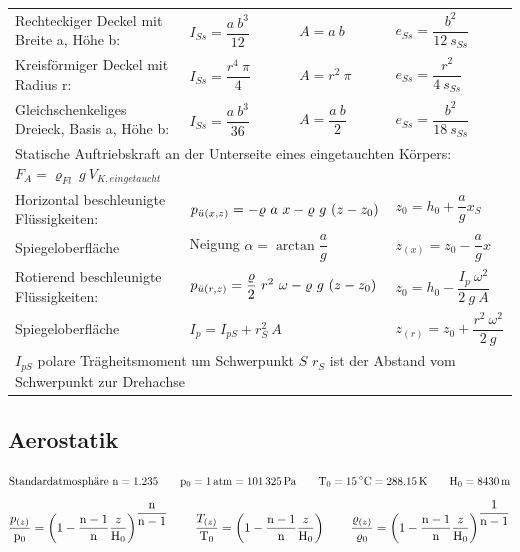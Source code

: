 	\begin{center}
		\setlength{\tabcolsep}{0.5em} %
		{\renewcommand{\arraystretch}{1.7}
		\begin{tabular}{llll}
			Rechteckiger Deckel mit Breite a, Höhe b:              & $ I_{Ss} = \dfrac{a\ b^3}{12} $  & $ A = a \ b $                                             & $ e_{Ss} = \dfrac{b^2}{12\ s_{Ss}} $            \\
			Kreisförmiger Deckel mit Radius r:                     & $ I_{Ss} = \dfrac{r^4\ \pi}{4} $ & $ A = r^2 \ \pi $                                         & $ e_{Ss} = \dfrac{r^2}{4\ s_{Ss}} $             \\
			Gleichschenkeliges Dreieck, Basis a, Höhe b:           & $ I_{Ss} = \dfrac{a\ b^3}{36} $  & $ A = \dfrac{a \ b}{2} $                                  & $ e_{Ss} = \dfrac{b^2}{18\ s_{Ss}} $            \\
			\multicolumn{4}{l}{Statische Auftriebskraft an der Unterseite eines eingetauchten Körpers:  $ F_A = \varrho_{Fl} \ g \ V_{K,eingetaucht} $ }                                                            \\
			Horizontal beschleunigte Flüssigkeiten:                & \multicolumn{2}{l}{$ p_{\ue(x,z)} = -\varrho\ a\ x - \varrho\ g\ (z-z_0) $}                  & $ z_0 = h_0 + \dfrac{a}{g} x_S $                \\
			\qquad Spiegeloberfläche                               & \multicolumn{2}{l}{ Neigung $ \alpha = \arctan \dfrac{a}{g} $}                               & $ z_{(x)} = z_0 - \dfrac{a}{g} x $              \\
			Rotierend beschleunigte Flüssigkeiten:                 & \multicolumn{2}{l}{$ p_{\ddot{u}(r,z)} = \dfrac{\varrho}{2}\ r^2\ \omega - \varrho\ g\ (z-z_0) $} & $ z_0 = h_0 - \dfrac{I_p\ \omega^2}{2\ g\ A} $  \\
			\qquad Spiegeloberfläche                               & \multicolumn{2}{l}{$ I_p = I_{pS} + r_S^2\ A $}                                              & $ z_{(r)} = z_0 + \dfrac{r^2\ \omega^2}{2\ g} $ \\
			 \multicolumn{4}{l}{$ I_{pS} $ polare Trägheitsmoment um Schwerpunkt $ S $ \quad $ r_S $ ist der Abstand vom Schwerpunkt zur Drehachse}
		\end{tabular}
		}
	\end{center}

\subsection{Aerostatik}
	\skipabove{-10pt}
	\[
		\text{Standardatmosphäre } \nn =  \num{1.235}
		\qquad  \po = \qty{1}{atm} = \qty{101325}{\Pa}
		\qquad  \To = \qty{15}{\degreeCelsius} = \qty{288,15}{\K}
		\qquad  \Ho = \qty{8430}{\m}
	\]
	\[
	  		   \dfrac{p_{(z)}}{\mathrm{p_0}} = \left( 1 - \dfrac{\mathrm{n}-1}{\mathrm{n}}  \dfrac{z}{\mathrm{H_0}} \right) ^{\dfrac{\mathrm{n}}{\mathrm{n}-1}}
	 	\qquad \dfrac{T_{(z)}}{\mathrm{T_0}} = \left( 1 - \dfrac{\mathrm{n}-1}{\mathrm{n}}  \dfrac{z}{\mathrm{H_0}} \right)
	  	\qquad \dfrac{\varrho_{(z)}}{\varrho_0} = \left( 1 - \dfrac{\mathrm{n}-1}{\mathrm{n}}  \dfrac{z}{\mathrm{H_0}} \right) ^{\dfrac{1}{\mathrm{n}-1}}
	\]

